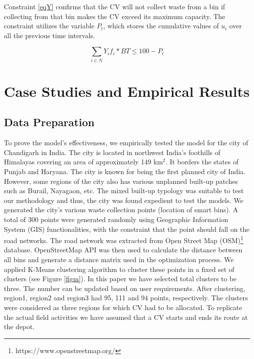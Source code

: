 \documentclass[12pt]{article}
\begin{document}
Constraint \eqref{eqY} confirms that the CV will not collect waste from a bin if collecting from that bin makes the CV exceed its maximum capacity. The constraint utilizes the variable $P_t$, which stores the cumulative values of $u_i$ over all the previous time intervals.

\begin{equation}\label{eqY}
	\sum_{i\in N}Y_i f_i* BT\le100-P_t
\end{equation}




\section{Case Studies and Empirical Results}

\subsection{Data Preparation}
To prove the model's effectiveness, we empirically tested the model for the city of Chandigarh in India. The city is located in northwest India's foothills of Himalayas covering an area of approximately 149 km$^2$. It borders the states of Punjab and Haryana. The city is known for being the first planned city of India. However, some regions of the city also has various unplanned built-up patches such as Burail, Nayagaon, etc. The mixed built-up typology was suitable to test our methodology and thus, the city was found expedient to test the models. We generated the city's various waste collection points (location of smart bins). A total of 300 points were generated randomly using Geographic Information System (GIS) functionalities, with the constraint that the point should fall on the road networks. The road network was extracted from Open Street Map (OSM)\footnote{https://www.openstreetmap.org/} database. OpenStreetMap API was then used to calculate the distance between all bins and generate a distance matrix used in the optimization process. We applied K-Means clustering algorithm to cluster these points in a fixed set of clusters (see Figure \ref{figm}). In this paper we have selected total clusters to be three. The number can be updated based on user requirements. After clustering, region1, region2 and region3 had 95, 111 and 94 points, respectively. The clusters were considered as three regions for which CV had to be allocated. To replicate the actual field activities we have assumed that a CV starts and ends its route at the depot.
\end{document}
